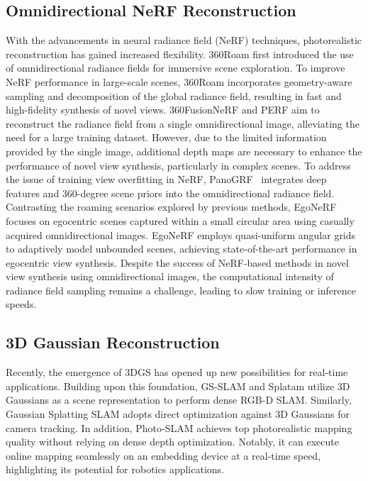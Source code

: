 \documentclass[10pt,twocolumn,letterpaper]{article}
\begin{document}
\subsection{Omnidirectional NeRF Reconstruction}
%
With the advancements in neural radiance field (NeRF) techniques, photorealistic reconstruction has gained increased flexibility. 
360Roam \cite{nerf:360roam} first introduced the use of omnidirectional radiance fields for immersive scene exploration.
To improve NeRF performance in large-scale scenes, 360Roam incorporates geometry-aware sampling and decomposition of the global radiance field, resulting in fast and high-fidelity synthesis of novel views. 360FusionNeRF \cite{nerf:360fusionnerf} and PERF \cite{nerf:perf} aim to reconstruct the radiance field from a single omnidirectional image, alleviating the need for a large training dataset. However, due to the limited information provided by the single image, additional depth maps are necessary to enhance the performance of novel view synthesis, particularly in complex scenes.
To address the issue of training view overfitting in NeRF, PanoGRF~\cite{nerf:panogrf} integrates deep features and 360-degree scene priors into the omnidirectional radiance field. Contrasting the roaming scenarios explored by previous methods, EgoNeRF \cite{nerf:egonerf} focuses on egocentric scenes captured within a small circular area using casually acquired omnidirectional images. EgoNeRF employs quasi-uniform angular grids to adaptively model unbounded scenes, achieving state-of-the-art performance in egocentric view synthesis.
Despite the success of NeRF-based methods in novel view synthesis using omnidirectional images, the computational intensity of radiance field sampling remains a challenge, leading to slow training or inference speeds. 

\subsection{3D Gaussian Reconstruction}
Recently, the emergence of 3DGS \cite{3dgs} has opened up new possibilities for real-time applications. Building upon this foundation, GS-SLAM \cite{3dgs:gsslam} and Splatam \cite{3dgs:splatam} utilize 3D Gaussians as a scene representation to perform dense RGB-D SLAM. Similarly, Gaussian Splatting SLAM \cite{3dgs:monoGS} adopts direct optimization against 3D Gaussians for camera tracking. In addition, Photo-SLAM \cite{3dgs:photoslam} achieves top photorealistic mapping quality without relying on dense depth optimization. Notably, it can execute online mapping seamlessly on an embedding device at a real-time speed, highlighting its potential for robotics applications.
\end{document}
